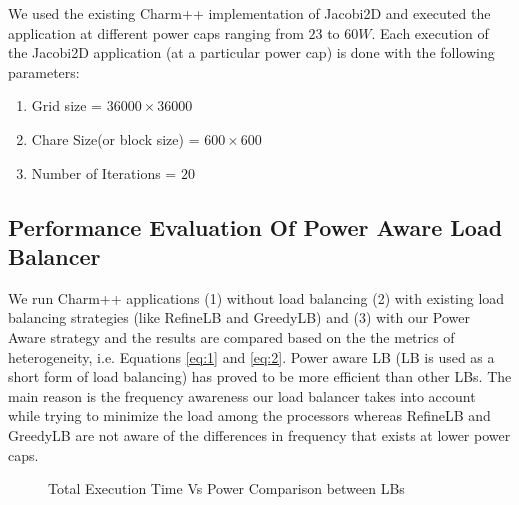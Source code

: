 We used the existing Charm++ implementation of Jacobi2D and executed the
application at different power caps ranging from $23$ to $60 W$.  Each
execution of the Jacobi2D application (at a particular power cap) is done with
the following parameters:

\begin{enumerate}
\item Grid size                   = $ 36000 \times 36000$
\item Chare Size(or block size)   = $600 \times 600$
\item Number of Iterations        = $20$
\end{enumerate}

\subsection{Performance Evaluation Of Power Aware Load Balancer} We run Charm++
  applications (1) without load balancing (2) with existing load balancing
  strategies (like  RefineLB and GreedyLB) and (3) with our Power Aware
  strategy and the results are compared based on the the metrics of
heterogeneity, i.e. Equations \eqref{eq:1} and \eqref{eq:2}.  Power aware LB
(LB is used as a short form of load balancing)
has proved to be more efficient than other LBs. The main reason is the
frequency awareness our load balancer takes into account while trying to
minimize the load among the processors whereas RefineLB and GreedyLB are not aware of the
differences in frequency that exists at lower power caps. 

\begin{figure}
\centering
\caption{Total Execution Time Vs Power Comparison between LBs} 
\label{fig:final_exec_time_vs_power}
\end{figure}
%

